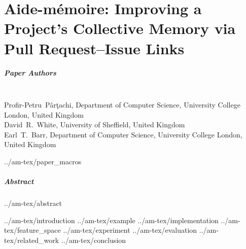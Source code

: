 \chapter{Aide-mémoire: Improving a Project’s Collective Memory via Pull Request--Issue Links}
\label{chapter:am}

\paragraph{Paper Authors}\\
Profir-Petru~P\^ar\c{t}achi, Department of Computer Science, University College London, United Kingdom\\
David~R.~White, University of Sheffield, United Kingdom\\
Earl~T.~Barr, Department of Computer Science, University College London, United Kingdom

{../am-tex/paper_macros}

\paragraph{Abstract}
{../am-tex/abstract}

{../am-tex/introduction}
{../am-tex/example}
{../am-tex/implementation}
{../am-tex/feature_space}
{../am-tex/experiment}
{../am-tex/evaluation}
{../am-tex/related_work}
{../am-tex/conclusion}
